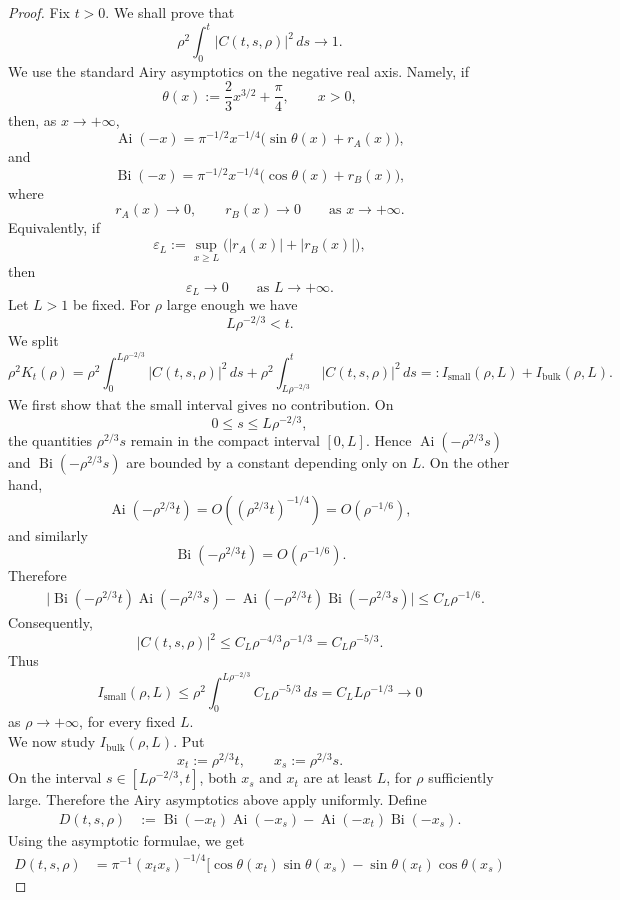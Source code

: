 \documentclass{article}
\newcommand{\Ai}{\operatorname{Ai}}
\newcommand{\Bi}{\operatorname{Bi}}
\begin{document}
\begin{proof}
Fix \(t>0\). We shall prove that
\[
  \rho^2\int_0^t |C(t,s,\rho)|^2\,ds \longrightarrow 1 .
\]
We use the standard Airy asymptotics on the negative real axis. Namely, if
\[
  \theta(x):=\frac23 x^{3/2}+\frac{\pi}{4},
  \qquad x>0,
\]
then, as \(x\to+\infty\),
\[
  \Ai(-x)
  =
  \pi^{-1/2}x^{-1/4}
  \bigl(\sin\theta(x)+r_A(x)\bigr),
\]
and
\[
  \Bi(-x)
  =
  \pi^{-1/2}x^{-1/4}
  \bigl(\cos\theta(x)+r_B(x)\bigr),
\]
where
\[
  r_A(x)\to0,\qquad r_B(x)\to0
  \qquad \text{as } x\to+\infty.
\]
Equivalently, if
\[
  \varepsilon_L
  :=
  \sup_{x\ge L}\bigl(|r_A(x)|+|r_B(x)|\bigr),
\]
then
\[
  \varepsilon_L\to0
  \qquad \text{as } L\to+\infty.
\]
Let \(L>1\) be fixed. For \(\rho\) large enough we have
\[
  L\rho^{-2/3}<t.
\]
We split
\[
  \rho^2K_t(\rho)
  =
  \rho^2\int_0^{L\rho^{-2/3}} |C(t,s,\rho)|^2\,ds
  +
  \rho^2\int_{L\rho^{-2/3}}^t |C(t,s,\rho)|^2\,ds
  =: I_{\mathrm{small}}(\rho,L)+I_{\mathrm{bulk}}(\rho,L).
\]
We first show that the small interval gives no contribution. On
\[
  0\le s\le L\rho^{-2/3},
\]
the quantities \(\rho^{2/3}s\) remain in the compact interval \([0,L]\). Hence
\(\Ai(-\rho^{2/3}s)\) and \(\Bi(-\rho^{2/3}s)\) are bounded by a constant depending only on \(L\). On the other hand,
\[
  \Ai(-\rho^{2/3}t)=O((\rho^{2/3}t)^{-1/4})
  =O(\rho^{-1/6}),
\]
and similarly
\[
  \Bi(-\rho^{2/3}t)=O(\rho^{-1/6}).
\]
Therefore
\[
\begin{aligned}
 &\Big|
 \Bi(-\rho^{2/3}t)\Ai(-\rho^{2/3}s)
 -
 \Ai(-\rho^{2/3}t)\Bi(-\rho^{2/3}s)
 \Big|
 \le C_L\rho^{-1/6}.
\end{aligned}
\]
Consequently,
\[
  |C(t,s,\rho)|^2
  \le C_L \rho^{-4/3}\rho^{-1/3}
  =
  C_L\rho^{-5/3}.
\]
Thus
\[
  I_{\mathrm{small}}(\rho,L)
  \le
  \rho^2
  \int_0^{L\rho^{-2/3}} C_L\rho^{-5/3}\,ds
  =
  C_L L \rho^{-1/3}
  \longrightarrow 0
\]
as \(\rho\to+\infty\), for every fixed \(L\).\\
We now study \(I_{\mathrm{bulk}}(\rho,L)\). Put
\[
  x_t:=\rho^{2/3}t,\qquad x_s:=\rho^{2/3}s .
\]
On the interval \(s\in[L\rho^{-2/3},t]\), both \(x_s\) and \(x_t\) are at least \(L\), for \(\rho\) sufficiently large. Therefore the Airy asymptotics above apply uniformly. Define
\[
\begin{aligned}
D(t,s,\rho)
&:=
\Bi(-x_t)\Ai(-x_s)
-
\Ai(-x_t)\Bi(-x_s).
\end{aligned}
\]
Using the asymptotic formulae, we get
\[
\begin{aligned}
D(t,s,\rho)
&=
\pi^{-1}(x_tx_s)^{-1/4}
\Big[
 \cos\theta(x_t)\sin\theta(x_s)
 -
 \sin\theta(x_t)\cos\theta(x_s)

\end{aligned}\]
\end{proof}
\end{document}
